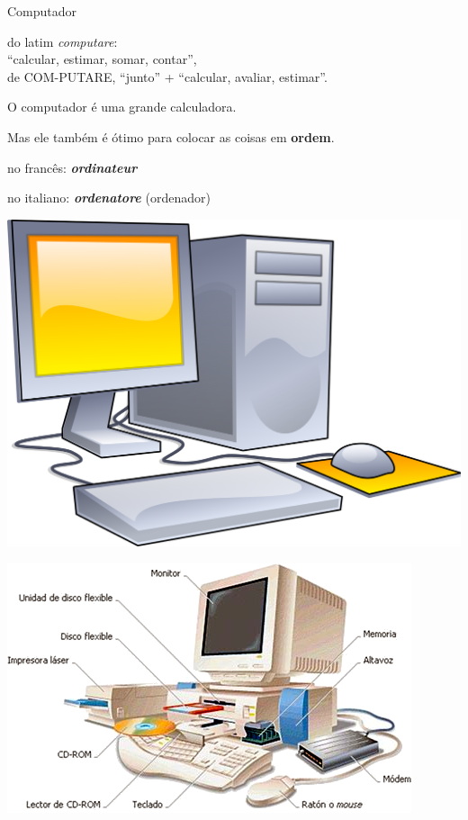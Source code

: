 \vfill\null
\pagebreak
{\Huge Computador\\}

{\LARGE do latim \textit{computare}:\\

“calcular, estimar, somar, contar”,\\

{\Large de COM-PUTARE, “junto” + “calcular, avaliar, estimar”.\\}

{\LARGE O computador é uma grande calculadora.}

\vfill
\pagebreak

{\LARGE Mas ele também é ótimo para colocar as coisas em \textbf{ordem}.\\}

{\Large no francês: \textit{\textbf{ordinateur}}
	
{\Large no italiano: \textit{\textbf{ordenatore}} (ordenador)\\
		
	\vfill
	\pagebreak

\begin{center}
	\includegraphics[height=\textheight]{./IMG/Desktop_computer_clipart_-_Yellow_theme.svg.png}
\end{center}

	\vfill
\pagebreak

\begin{center}
	\includegraphics[height=\textheight]{./IMG/th-1517019610.jpg}
\end{center}

}}}
